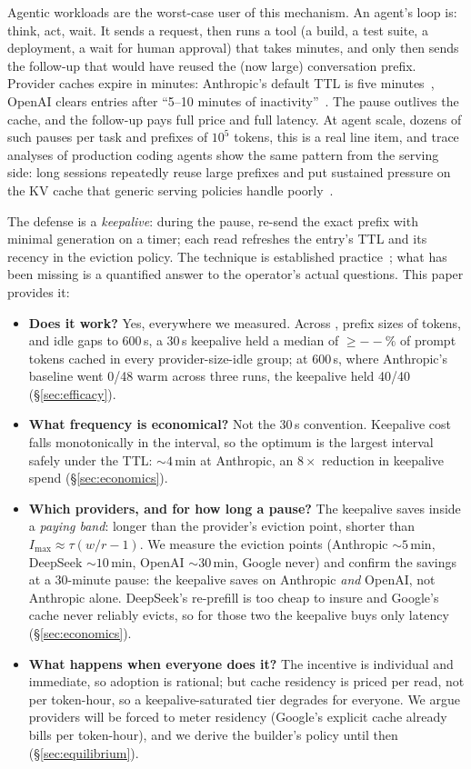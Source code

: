 \documentclass[10pt,twocolumn]{article}
\providecommand{\keepaliveMinHit}{--}\providecommand{\bestSavingRatio}{--}\providecommand{\bestSavingDesc}{--}%
\begin{document}
Agentic workloads are the worst-case user of this mechanism. An agent's loop
is: think, act, wait. It sends a request, then runs a tool (a build, a test
suite, a deployment, a wait for human approval) that takes minutes, and only
then sends the follow-up that would have reused the (now large) conversation
prefix. Provider caches expire in minutes: Anthropic's default TTL is five
minutes~\cite{anthropic-caching}, OpenAI clears entries after ``5--10 minutes
of inactivity''~\cite{openai-caching}. The pause outlives the cache, and the
follow-up pays full price and full latency. At agent scale, dozens of such
pauses per task and prefixes of $10^5$ tokens, this is a real line item, and
trace analyses of production coding agents show the same pattern from the
serving side: long sessions repeatedly reuse large prefixes and put sustained
pressure on the KV cache that generic serving policies handle
poorly~\cite{cachewise}.

The defense is a \emph{keepalive}: during the pause, re-send the exact prefix
with minimal generation on a timer; each read refreshes the entry's TTL and its
recency in the eviction policy. The technique is established
practice~\cite{aider-keepalive,anthropic-prewarm}; what has been missing is a
quantified answer to the operator's actual questions. This paper provides it:

\begin{itemize}\itemsep2pt
\item \textbf{Does it work?} Yes, everywhere we measured. Across
\dataVendorsNice{}, prefix sizes of \dataSizes{} tokens, and idle gaps to
600\,s, a 30\,s keepalive held a median of ${\geq}\keepaliveMinHit\%$ of prompt
tokens cached in every provider-size-idle group; at 600\,s, where Anthropic's
baseline went 0/48 warm across three runs, the keepalive held 40/40
(\S\ref{sec:efficacy}).
\item \textbf{What frequency is economical?} Not the 30\,s convention.
Keepalive cost falls monotonically in the interval, so the optimum is the
largest interval safely under the TTL: ${\sim}4$\,min at Anthropic, an $8\times$
reduction in keepalive spend (\S\ref{sec:economics}).
\item \textbf{Which providers, and for how long a pause?} The keepalive saves
inside a \emph{paying band}: longer than the provider's eviction point, shorter
than $I_{\max} \approx \tau(w/r-1)$. We measure the eviction points (Anthropic
${\sim}5$\,min, DeepSeek ${\sim}10$\,min, OpenAI ${\sim}30$\,min, Google never)
and confirm the savings at a 30-minute pause: the keepalive saves on Anthropic
\emph{and} OpenAI, not Anthropic alone. DeepSeek's re-prefill is too cheap to
insure and Google's cache never reliably evicts, so for those two the keepalive
buys only latency (\S\ref{sec:economics}).
\item \textbf{What happens when everyone does it?} The incentive is individual
and immediate, so adoption is rational; but cache residency is priced per read,
not per token-hour, so a keepalive-saturated tier degrades for everyone. We
argue providers will be forced to meter residency (Google's explicit cache
already bills per token-hour), and we derive the builder's policy until then
(\S\ref{sec:equilibrium}).
\end{itemize}
\end{document}
